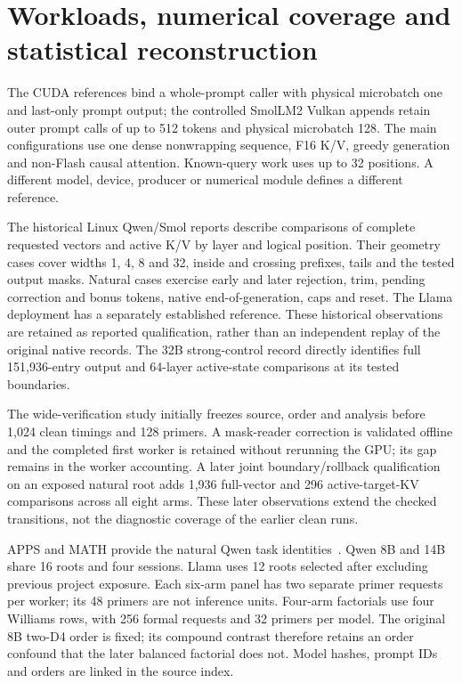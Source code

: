 \section{Workloads, numerical coverage and statistical reconstruction}
\label{sec:supp-design}
The CUDA references bind a whole-prompt caller with physical microbatch one and last-only prompt output; the controlled SmolLM2 Vulkan appends retain outer prompt calls of up to 512 tokens and physical microbatch 128. The main configurations use one dense nonwrapping sequence, F16 K/V, greedy generation and non-Flash causal attention. Known-query work uses up to 32 positions. A different model, device, producer or numerical module defines a different reference.

The historical Linux Qwen/Smol reports describe comparisons of complete requested vectors and active K/V by layer and logical position. Their geometry cases cover widths 1, 4, 8 and 32, inside and crossing prefixes, tails and the tested output masks. Natural cases exercise early and later rejection, trim, pending correction and bonus tokens, native end-of-generation, caps and reset. The Llama deployment has a separately established reference. These historical observations are retained as reported qualification, rather than an independent replay of the original native records. The 32B strong-control record directly identifies full 151,936-entry output and 64-layer active-state comparisons at its tested boundaries.

The wide-verification study initially freezes source, order and analysis before 1,024 clean timings and 128 primers. A mask-reader correction is validated offline and the completed first worker is retained without rerunning the GPU; its gap remains in the worker accounting. A later joint boundary/rollback qualification on an exposed natural root adds 1,936 full-vector and 296 active-target-KV comparisons across all eight arms. These later observations extend the checked transitions, not the diagnostic coverage of the earlier clean runs.

APPS and MATH provide the natural Qwen task identities~\cite{apps,math}. Qwen 8B and 14B share 16 roots and four sessions. Llama uses 12 roots selected after excluding previous project exposure. Each six-arm panel has two separate primer requests per worker; its 48 primers are not inference units. Four-arm factorials use four Williams rows, with 256 formal requests and 32 primers per model. The original 8B two-D4 order is fixed; its compound contrast therefore retains an order confound that the later balanced factorial does not. Model hashes, prompt IDs and orders are linked in the source index.

